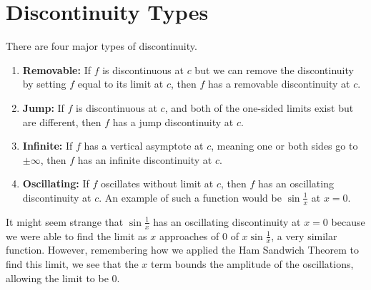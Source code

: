\section{Discontinuity Types}
There are four major types of discontinuity.
\begin{enumerate}[label=]
	\item \textbf{Removable: } If $f$ is discontinuous at $c$ but we can remove the discontinuity by setting $f$ equal to its limit at $c$, then $f$ has a removable discontinuity at $c$.
	\item \textbf{Jump: } If $f$ is discontinuous at $c$, and both of the one-sided limits exist but are different, then $f$ has a jump discontinuity at $c$.
	\item \textbf{Infinite: } If $f$ has a vertical asymptote at $c$, meaning one or both sides go to $\pm\infty$, then $f$ has an infinite discontinuity at $c$.
	\item \textbf{Oscillating: } If $f$ oscillates without limit at $c$, then $f$ has an oscillating discontinuity at $c$. An example of such a function would be $\sin{\frac{1}{x}}$ at $x=0$.
\end{enumerate}


It might seem strange that $\sin{\frac{1}{x}}$ has an oscillating discontinuity at $x=0$ because we were able to find the limit as $x$ approaches of 0 of $x\sin{\frac{1}{x}}$, a very similar function.
However, remembering how we applied the Ham Sandwich Theorem to find this limit, we see that the $x$ term bounds the amplitude of the oscillations, allowing the limit to be $0$.

